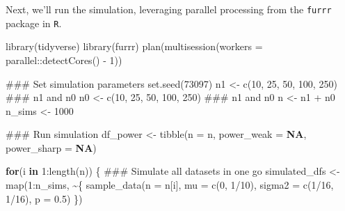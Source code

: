 \documentclass[
  11pt,
  letterpaper,
  DIV=11,
  numbers=noendperiod]{scrartcl}
\newenvironment{Shaded}{}{}
\newcommand{\AttributeTok}[1]{\textcolor[rgb]{0.84,0.60,0.13}{#1}}
\newcommand{\ConstantTok}[1]{\textcolor[rgb]{0.69,0.38,0.53}{\textbf{#1}}}
\newcommand{\ControlFlowTok}[1]{\textcolor[rgb]{0.80,0.14,0.11}{\textbf{#1}}}
\newcommand{\DecValTok}[1]{\textcolor[rgb]{0.96,0.45,0.00}{#1}}
\newcommand{\DocumentationTok}[1]{\textcolor[rgb]{0.60,0.59,0.10}{#1}}
\newcommand{\FloatTok}[1]{\textcolor[rgb]{0.96,0.45,0.00}{#1}}
\newcommand{\FunctionTok}[1]{\textcolor[rgb]{0.41,0.62,0.42}{#1}}
\newcommand{\NormalTok}[1]{\textcolor[rgb]{0.24,0.22,0.21}{#1}}
\newcommand{\OtherTok}[1]{\textcolor[rgb]{0.41,0.62,0.42}{#1}}
\newcommand{\SpecialCharTok}[1]{\textcolor[rgb]{0.69,0.38,0.53}{#1}}
\newcommand{\StringTok}[1]{\textcolor[rgb]{0.60,0.59,0.10}{#1}}
\begin{document}
Next, we'll run the simulation, leveraging parallel processing from the
\texttt{furrr} package in \texttt{R}.

\begin{Shaded}
\begin{Highlighting}[]
\FunctionTok{library}\NormalTok{(tidyverse)}
\FunctionTok{library}\NormalTok{(furrr)}
\FunctionTok{plan}\NormalTok{(}\FunctionTok{multisession}\NormalTok{(}\AttributeTok{workers =}\NormalTok{ parallel}\SpecialCharTok{::}\FunctionTok{detectCores}\NormalTok{() }\SpecialCharTok{{-}} \DecValTok{1}\NormalTok{))}

\DocumentationTok{\#\#\# Set simulation parameters}
\FunctionTok{set.seed}\NormalTok{(}\DecValTok{73097}\NormalTok{)}
\NormalTok{n1 }\OtherTok{\textless{}{-}} \FunctionTok{c}\NormalTok{(}\DecValTok{10}\NormalTok{, }\DecValTok{25}\NormalTok{, }\DecValTok{50}\NormalTok{, }\DecValTok{100}\NormalTok{, }\DecValTok{250}\NormalTok{) }\DocumentationTok{\#\#\# n1 and n0}
\NormalTok{n0 }\OtherTok{\textless{}{-}} \FunctionTok{c}\NormalTok{(}\DecValTok{10}\NormalTok{, }\DecValTok{25}\NormalTok{, }\DecValTok{50}\NormalTok{, }\DecValTok{100}\NormalTok{, }\DecValTok{250}\NormalTok{) }\DocumentationTok{\#\#\# n1 and n0}
\NormalTok{n }\OtherTok{\textless{}{-}}\NormalTok{ n1 }\SpecialCharTok{+}\NormalTok{ n0}
\NormalTok{n\_sims }\OtherTok{\textless{}{-}} \DecValTok{1000}

\DocumentationTok{\#\#\# Run simulation}
\NormalTok{df\_power }\OtherTok{\textless{}{-}} 
  \FunctionTok{tibble}\NormalTok{(}\StringTok{\textquotesingle{}n\textquotesingle{}} \OtherTok{=}\NormalTok{ n,}
         \StringTok{\textquotesingle{}power\_weak\textquotesingle{}} \OtherTok{=} \ConstantTok{NA}\NormalTok{,}
         \StringTok{\textquotesingle{}power\_sharp\textquotesingle{}} \OtherTok{=} \ConstantTok{NA}\NormalTok{)}


\ControlFlowTok{for}\NormalTok{(i }\ControlFlowTok{in} \DecValTok{1}\SpecialCharTok{:}\FunctionTok{length}\NormalTok{(n)) \{}
  \DocumentationTok{\#\#\# Simulate all datasets in one go}
\NormalTok{  simulated\_dfs }\OtherTok{\textless{}{-}} 
    \FunctionTok{map}\NormalTok{(}\DecValTok{1}\SpecialCharTok{:}\NormalTok{n\_sims, }\SpecialCharTok{\textasciitilde{}}\NormalTok{\{}
      \FunctionTok{sample\_data}\NormalTok{(}\AttributeTok{n =}\NormalTok{ n[i], }\AttributeTok{mu =} \FunctionTok{c}\NormalTok{(}\DecValTok{0}\NormalTok{, }\DecValTok{1}\SpecialCharTok{/}\DecValTok{10}\NormalTok{), }\AttributeTok{sigma2 =} \FunctionTok{c}\NormalTok{(}\DecValTok{1}\SpecialCharTok{/}\DecValTok{16}\NormalTok{, }\DecValTok{1}\SpecialCharTok{/}\DecValTok{16}\NormalTok{), }\AttributeTok{p =} \FloatTok{0.5}\NormalTok{)}
\NormalTok{    \})}
  

\end{Highlighting}
\end{Shaded}
\end{document}
